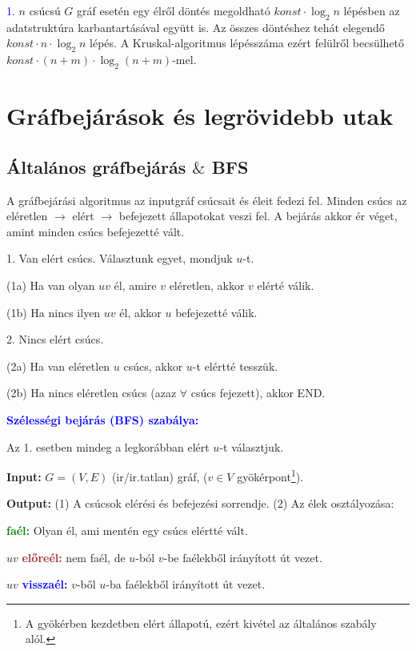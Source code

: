 \documentclass[12pt]{article}
\begin{document}
			\textcolor{blue}{1.} $n$ csúcsú $G$ gráf esetén egy élről döntés megoldható $konst \cdot \log_2n$ lépésben az adatstruktúra karbantartásával együtt is. Az összes döntéshez tehát elegendő $konst \cdot n \cdot \log_2n$ lépés. A Kruskal-algoritmus lépésszáma ezért felülről becsülhető $konst \cdot (n+m) \cdot \log_2(n+m)$-mel.
		
	\section{Gráfbejárások és legrövidebb utak}
		
		\subsection{Általános gráfbejárás $\&$ BFS}

			A gráfbejárási algoritmus az inputgráf csúcsait és éleit fedezi fel. Minden csúcs az eléretlen $\rightarrow$ elért $\rightarrow$ befejezett állapotokat veszi fel. A bejárás akkor ér véget, amint minden csúcs befejezetté vált. 

			1. Van elért csúcs. Választunk egyet, mondjuk $u$-t.
				
			(1a) Ha van olyan $uv$ él, amire $v$ eléretlen, akkor $v$ elérté válik.

			(1b) Ha nincs ilyen $uv$ él, akkor $u$ befejezetté válik.

			2. Nincs elért csúcs.

			(2a) Ha van eléretlen $u$ csúcs, akkor $u$-t elértté tesszük.

			(2b) Ha nincs eléretlen csúcs (azaz $\forall$ csúcs fejezett), akkor END.

			\textbf{\textcolor{blue}{Szélességi bejárás (BFS) szabálya:}}

			Az 1. esetben mindeg a legkorábban elért $u$-t választjuk.

			\textbf{Input:} $G = (V,E)$ (ir/ir.tatlan) gráf, ($v \in V$ gyökérpont\footnote{A gyökérben kezdetben elért állapotú, ezért kivétel az általános szabály alól.}).

			\textbf{Output:} (1) A csúcsok elérési és befejezési sorrendje. (2) Az élek osztályozása:

			\textbf{\textcolor{green}{faél:}} Olyan él, ami mentén egy csúcs elértté vált.

			$uv$ \textbf{\textcolor{brown}{előreél:}} nem faél, de $u$-ból $v$-be faélekből irányított út vezet.

			$uv$ \textbf{\textcolor{blue}{visszaél:}} $v$-ből $u$-ba faélekből irányított út vezet.
\end{document}
